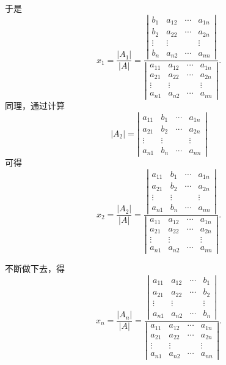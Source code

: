 \documentclass[UTF8, 12pt, fontset=fandol, oneside]{ctexart}
\begin{document}
于是
\[
x_1=\frac{|A_1|}{|A|}
=
\frac{
\left|\begin{array}{cccc}
b_1 & a_{12} & \cdots & a_{1n}\\
b_2 & a_{22} & \cdots & a_{2n}\\
\vdots & \vdots & & \vdots\\
b_n & a_{n2} & \cdots & a_{nn}
\end{array}\right|}
{\left|\begin{array}{cccc}
a_{11} & a_{12} & \cdots & a_{1n}\\
a_{21} & a_{22} & \cdots & a_{2n}\\
\vdots & \vdots & & \vdots\\
a_{n1} & a_{n2} & \cdots & a_{nn}
\end{array}\right|}.
\]
同理，通过计算
\[
|A_2|=
\left|\begin{array}{cccc}
a_{11} & b_1 & \cdots & a_{1n}\\
a_{21} & b_2 & \cdots & a_{2n}\\
\vdots & \vdots & & \vdots\\
a_{n1} & b_n & \cdots & a_{nn}
\end{array}\right|
\]
可得
\[
x_2=\frac{|A_2|}{|A|}
=
\frac{
\left|\begin{array}{cccc}
a_{11} & b_1 & \cdots & a_{1n}\\
a_{21} & b_2 & \cdots & a_{2n}\\
\vdots & \vdots & & \vdots\\
a_{n1} & b_n & \cdots & a_{nn}
\end{array}\right|}
{\left|\begin{array}{cccc}
a_{11} & a_{12} & \cdots & a_{1n}\\
a_{21} & a_{22} & \cdots & a_{2n}\\
\vdots & \vdots & & \vdots\\
a_{n1} & a_{n2} & \cdots & a_{nn}
\end{array}\right|}.
\]

不断做下去，得
\[
x_n=\frac{|A_n|}{|A|}
=
\frac{
\left|\begin{array}{cccc}
a_{11} & a_{12} & \cdots & b_1\\
a_{21} & a_{22} & \cdots & b_2\\
\vdots & \vdots & & \vdots\\
a_{n1} & a_{n2} & \cdots & b_n
\end{array}\right|}
{\left|\begin{array}{cccc}
a_{11} & a_{12} & \cdots & a_{1n}\\
a_{21} & a_{22} & \cdots & a_{2n}\\
\vdots & \vdots & & \vdots\\
a_{n1} & a_{n2} & \cdots & a_{nn}
\end{array}\right|}.
\]
\end{document}
